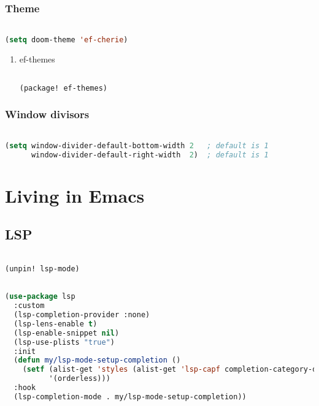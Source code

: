 \documentclass[11pt]{article}
\begin{document}
\subsubsection{Theme}
\label{sec:theme}
\begin{lstlisting}[language=Lisp]%! Someone please complete this list for me

(setq doom-theme 'ef-cherie)
\end{lstlisting}

\begin{enumerate}
  \item ef-themes
  \label{sec:ef-themes}

  \begin{lstlisting}[language=Lisp]%! Someone please complete this list for me

(package! ef-themes)
\end{lstlisting}
\end{enumerate}

\subsubsection{Window divisors}
\label{sec:window-divisors}
\begin{lstlisting}[language=Lisp]%! Someone please complete this list for me

(setq window-divider-default-bottom-width 2   ; default is 1
      window-divider-default-right-width  2)  ; default is 1
\end{lstlisting}



\section{Living in Emacs}
\label{sec:living-in-emacs}


\subsection{LSP}
\label{sec:lsp}
\begin{lstlisting}[language=Lisp]%! Someone please complete this list for me

(unpin! lsp-mode)
\end{lstlisting}

\begin{lstlisting}[language=Lisp]%! Someone please complete this list for me

(use-package lsp
  :custom
  (lsp-completion-provider :none)
  (lsp-lens-enable t)
  (lsp-enable-snippet nil)
  (lsp-use-plists "true")
  :init
  (defun my/lsp-mode-setup-completion ()
    (setf (alist-get 'styles (alist-get 'lsp-capf completion-category-defaults))
          '(orderless)))
  :hook
  (lsp-completion-mode . my/lsp-mode-setup-completion))
\end{lstlisting}
\end{document}
